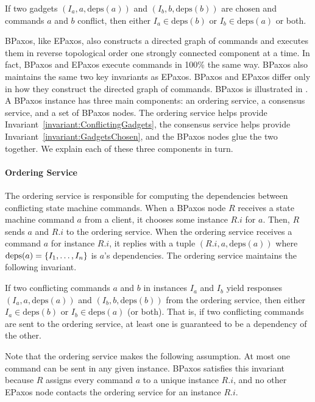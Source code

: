 \documentclass{mwhittaker}
\theoremstyle{definition}
\newcommand{\deps}[1]{\text{deps}(#1)}
\newcommand{\invlabel}[1]{\label{invariant:#1}}
\newcommand{\invref}[1]{Invariant~\ref{invariant:#1}}
\begin{document}
\begin{boxedinvariant}\invlabel{ConflictingGadgets}
  If two gadgets $(I_a, a, \deps{a})$ and $(I_b, b, \deps{b})$ are chosen and
  commands $a$ and $b$ conflict, then either $I_a \in \deps{b}$ or $I_b \in
  \deps{a}$ or both.
\end{boxedinvariant}

BPaxos, like EPaxos, also constructs a directed graph of commands and executes
them in reverse topological order one strongly connected component at a time.
In fact, BPaxos and EPaxos execute commands in 100\% the same way. BPaxos also
maintains the same two key invariants as EPaxos. BPaxos and EPaxos differ only
in how they construct the directed graph of commands.
%
BPaxos is illustrated in . A BPaxos instance has three main
components: an ordering service, a consensus service, and a set of BPaxos
nodes. The ordering service helps provide \invref{ConflictingGadgets}, the
consensus service helps provide \invref{GadgetsChosen}, and the BPaxos nodes
glue the two together. We explain each of these three components in turn.

{}

\paragraph{Ordering Service}
The ordering service is responsible for computing the dependencies between
conflicting state machine commands. When a BPaxos node $R$ receives a state
machine command $a$ from a client, it chooses some instance $R.i$ for $a$.
Then, $R$ sends $a$ and $R.i$ to the ordering service. When the ordering
service receives a command $a$ for instance $R.i$, it replies with a tuple
$(R.i, a, \deps{a})$ where $\deps{a} = \set{I_1, \ldots, I_n}$ is $a$'s
dependencies.
%
The ordering service maintains the following invariant.

\begin{boxedinvariant}\invlabel{OrderingService}
If two conflicting commands $a$ and $b$ in instances $I_a$ and $I_b$ yield
responses $(I_a, a, \deps{a})$ and $(I_b, b, \deps{b})$ from the ordering
service, then either $I_a \in \deps{b}$ or $I_b \in \deps{a}$ (or both). That
is, if two conflicting commands are sent to the ordering service, at least one
is guaranteed to be a dependency of the other.
\end{boxedinvariant}

Note that the ordering service makes the following assumption. At most one
command can be sent in any given instance. BPaxos satisfies this invariant
because $R$ assigns every command $a$ to a unique instance $R.i$, and no other
EPaxos node contacts the ordering service for an instance $R.i$.
\end{document}
